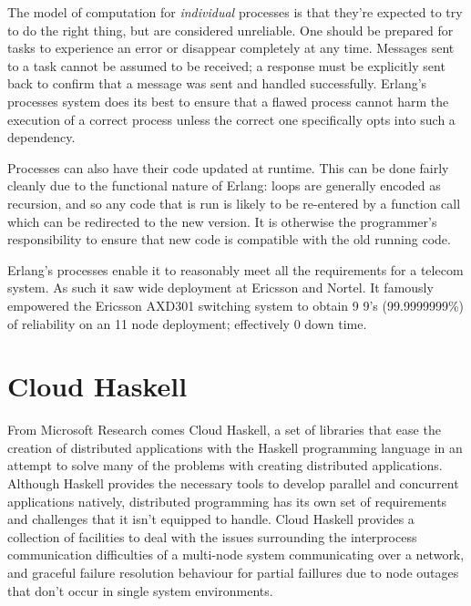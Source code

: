 \documentclass[10pt,a4paper,twocolumn]{article}
\begin{document}
The model of computation for \emph{individual} processes is that they're
expected to try to do the right thing, but are considered unreliable. One should
be prepared for tasks to experience an error or disappear completely at any
time. Messages sent to a task cannot be assumed to be received; a response must
be explicitly sent back to confirm that a message was sent and handled
successfully. Erlang's processes system does its best to ensure that a flawed
process cannot harm the execution of a correct process unless the correct one
specifically opts into such a dependency.

Processes can also have their code updated at runtime. This can be done fairly
cleanly due to the functional nature of Erlang: loops are generally encoded as
recursion, and so any code that is run is likely to be re-entered by a function
call which can be redirected to the new version. It is otherwise the
programmer's responsibility to ensure that new code is compatible with the old
running code. \cite{erlangthesis}

Erlang's processes enable it to reasonably meet all the requirements for a
telecom system. As such it saw wide deployment at Ericsson and Nortel. It
famously empowered the Ericsson AXD301 switching system to obtain 9 9's
(99.9999999\%) of reliability on an 11 node deployment; effectively 0 down time.
\cite{erlangthesis}


\section{Cloud Haskell}

From Microsoft Research comes Cloud Haskell, a set of libraries that ease the
creation of distributed applications with the Haskell programming language in an
attempt to solve many of the problems with creating distributed applications.
Although Haskell provides the necessary tools to develop parallel and concurrent
applications natively, distributed programming has its own set of requirements
and challenges that it isn't equipped to handle. Cloud Haskell provides a
collection of facilities to deal with the issues surrounding the interprocess
communication difficulties of a multi-node system communicating over a network,
and graceful failure resolution behaviour for partial faillures due to node
outages that don't occur in single system environments.
\end{document}
